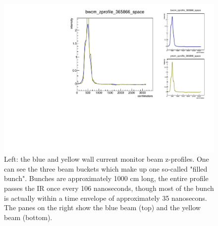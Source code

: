 \begin{figure}
\begin{center}
\includegraphics[width=\linewidth,height=\textheight,keepaspectratio]{./figures/365866_wcm_zprofile}
\caption{ 
Left: the blue and yellow wall current monitor beam z-profiles. One can see the
three beam buckets which make up one so-called "filled bunch". Bunches are
approximately 1000 cm long, the entire profile passes the IR once every 106
nanoseconds, though most of the bunch is actually within a time envelope of
approximately 35 nanosecons. The panes on the right show the blue beam (top)
and the yellow beam (bottom).
}
\label{fig:365866_wcm_zprofile}
\end{center}
\end{figure}
